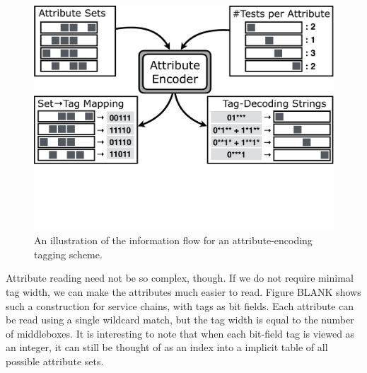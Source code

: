





\begin{figure}[t!] \begin{minipage}{1\linewidth} \includegraphics[trim={0 8cm 0
0}, clip, width=\linewidth]{figures/system_flow2} \end{minipage} \caption{An
illustration of the information flow for an attribute-encoding tagging scheme.}
\label{fig:system_flow} \end{figure}

Attribute reading need not be so complex, though. If we do not require minimal
tag width, we can make the attributes much easier to read. Figure BLANK shows
such a construction for service chains, with tags as bit fields. Each attribute
can be read using a single wildcard match, but the tag width is equal to the
number of middleboxes. It is interesting to note that when each bit-field tag is
viewed as an integer, it can still be thought of as an index into a implicit
table of all possible attribute sets. 

